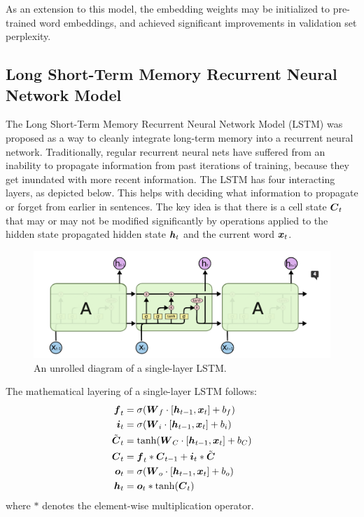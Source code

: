 \documentclass[11pt]{article}
\begin{document}
As an extension to this model, the embedding weights may be initialized to pre-trained word embeddings, and achieved significant improvements in validation set perplexity.

\subsection{Long Short-Term Memory Recurrent Neural Network Model}
The Long Short-Term Memory Recurrent Neural Network Model (LSTM) was proposed as a way to cleanly integrate long-term memory into a recurrent neural network.  Traditionally, regular recurrent neural nets have suffered from an inability to propagate information from past iterations of training, because they get inundated with more recent information.  The LSTM has four interacting layers, as depicted below.  This helps with deciding what information to propagate or forget from earlier in sentences.  The key idea is that there is a cell state $\boldsymbol{C}_t$ that may or may not be modified significantly by operations applied to the hidden state propagated hidden state $\boldsymbol{h}_t$ and the current word $\boldsymbol{x}_t$. 

\begin{figure}[H]
\begin{center}
\includegraphics[scale=0.5]{lstm}
\caption{An unrolled diagram of a single-layer LSTM.}
\end{center} 
\end{figure}

\noindent
The mathematical layering of a single-layer LSTM follows:
\begin{align*}
\boldsymbol{f}_t &= \sigma(\boldsymbol{W}_f \cdot [\boldsymbol{h}_{t-1}, \boldsymbol{x}_t] + b_f) \\
\boldsymbol{i}_t &= \sigma(\boldsymbol{W}_i \cdot [\boldsymbol{h}_{t-1}, \boldsymbol{x}_t] + b_i) \\
\tilde{\boldsymbol{C}}_t &= \tanh(\boldsymbol{W}_C \cdot [\boldsymbol{h}_{t-1}, \boldsymbol{x}_t]  + b_C) \\
\boldsymbol{C}_t &= \boldsymbol{f}_t * \boldsymbol{C}_{t-1} + \boldsymbol{i}_t * \tilde{\boldsymbol{C}} \\
\boldsymbol{o}_t &= \sigma(\boldsymbol{W}_o \cdot [\boldsymbol{h}_{t-1}, \boldsymbol{x}_t]  + b_o) \\
\boldsymbol{h}_t &= \boldsymbol{o}_t * \tanh(\boldsymbol{C}_t)
\end{align*}
where $*$ denotes the element-wise multiplication operator. 
\end{document}
